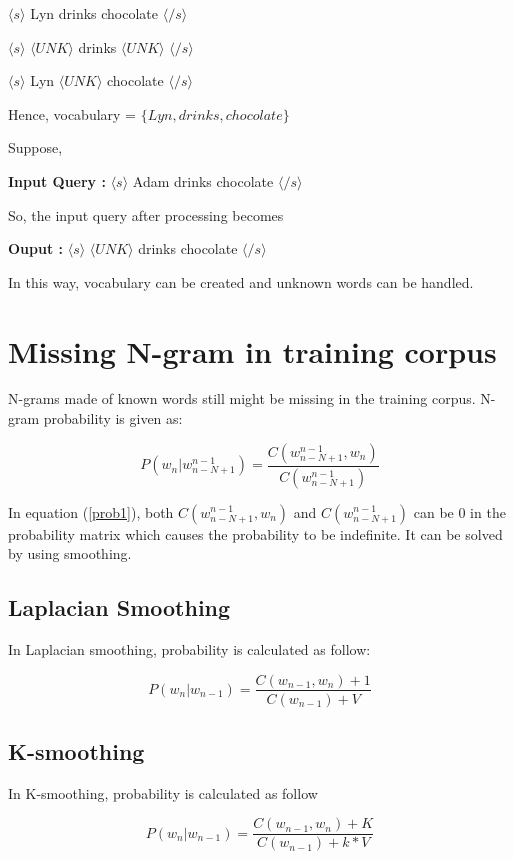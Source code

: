 $\langle s \rangle$ Lyn drinks chocolate $\langle /s \rangle$

$\langle s \rangle$ $\langle UNK \rangle$ drinks $\langle UNK \rangle$ $\langle /s \rangle$

$\langle s \rangle$ Lyn $\langle UNK \rangle$ chocolate $\langle /s \rangle$

Hence, vocabulary = $\{Lyn, drinks, chocolate\}$

Suppose,

\textbf{Input Query : } $\langle s \rangle$ Adam drinks chocolate $\langle /s \rangle$

So, the input query after processing becomes

\textbf{Ouput : }$\langle s \rangle$ $\langle UNK \rangle$ drinks chocolate $\langle /s \rangle$

In this way, vocabulary can be created and unknown words can be handled.

\section{Missing N-gram in training corpus}
N-grams made of known words still might be missing in the training corpus. N-gram probability is given as:

\begin{equation}\label{prob1}
	P(w_n | w_{n - N + 1}^{n - 1}) = \frac{C(w_{n - N + 1}^{n - 1}, w_n)}{C(w_{n - N + 1}^{n - 1})}
\end{equation}

In equation (\ref{prob1}), both $C(w_{n - N + 1}^{n - 1}, w_n)$ and $C(w_{n - N + 1}^{n - 1})$ can be 0 in the probability matrix which causes the probability to be indefinite. It can be solved by using smoothing.

\subsection{Laplacian Smoothing}
In Laplacian smoothing, probability is calculated as follow:

\begin{equation}
	P(w_n | w_{n - 1}) = \frac{C(w_{n - 1}, w_n) + 1}{C(w_{n - 1}) + V}
\end{equation}

\subsection{K-smoothing}
In K-smoothing, probability is calculated as follow

\begin{equation}
	P(w_n | w_{n - 1}) = \frac{C(w_{n - 1}, w_n) + K}{C(w_{n - 1}) + k * V}
\end{equation}

